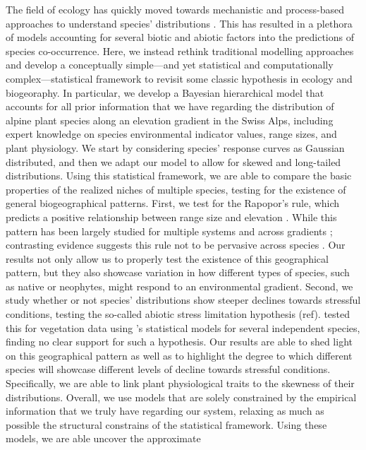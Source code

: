 \documentclass[11pt, a4paper]{article}
\begin{document}

The field of ecology has quickly moved towards mechanistic and process-based approaches to understand species' distributions \citep{wartonManyVariablesJoint2015}. This has resulted in a plethora of models accounting for several biotic and abiotic factors into the predictions of species co-occurrence. Here, we instead rethink traditional modelling approaches and develop a conceptually simple---and yet statistical and computationally complex---statistical framework to revisit some classic hypothesis in ecology and biogeoraphy. In particular, we develop a Bayesian hierarchical model that accounts for all prior information that we have regarding the distribution of alpine plant species along an elevation gradient in the Swiss Alps, including expert knowledge on species environmental indicator values, range sizes, and plant physiology. We start by considering species' response curves as Gaussian distributed, and then we adapt our model to allow for skewed and long-tailed distributions. Using this statistical framework, we are able to compare the basic properties of the realized niches of multiple species, testing for the existence of general biogeographical patterns. First, we test for the Rapopor's rule, which predicts a positive relationship between range size and elevation \citep{stevensElevationalGradientAltitudinal1992}. While this pattern has been largely studied for multiple systems and across gradients \citep{mccainElevationalRapoportRule2013}; contrasting evidence suggests this rule not to be pervasive across species \citep{ribasRapoportEffectWidespread2006, bhattaraiCanRapoportRule2006, mccainElevationalRapoportRule2013}. Our results not only allow us to properly test the existence of this geographical pattern, but they also showcase variation in how different types of species, such as native or neophytes, might respond to an environmental gradient. Second, we study whether or not species' distributions show steeper declines towards stressful conditions, testing the so-called abiotic stress limitation hypothesis (ref). \citet{normandImportanceAbioticStress2009} tested this for vegetation data using \citeauthor{huismanHierarchicalSetModels1993}'s statistical models for several independent species, finding no clear support for such a hypothesis. Our results are able to shed light on this geographical pattern as well as to highlight the degree to which different species will showcase different levels of decline towards stressful conditions. Specifically, we are able to link plant physiological traits to the skewness of their distributions. Overall, we use models that are solely constrained by the empirical information that we truly have regarding our system, relaxing as much as possible the structural constrains of the statistical framework. Using these models, we are able uncover the approximate 
\end{document}
